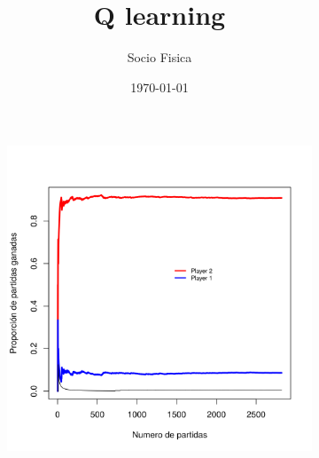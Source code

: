 \documentclass[shownotes]{beamer}
\title{Q learning}
\author{Socio Fisica}
\institute[DC-UBA]{FCEyN - UBA}
\date{\today}
\begin{document}



\begin{frame}

\titlepage
  
\end{frame}

\begin{frame}{}


\begin{figure}[H]
    \centering
    \begin{subfigure}[b]{0.45\textwidth}
      \includegraphics[width=\textwidth]{../Imagenes/SinVision_luchaNoLibre_QsinVison_reverse}
    \end{subfigure}
\end{figure}

\end{frame}
\end{document}

